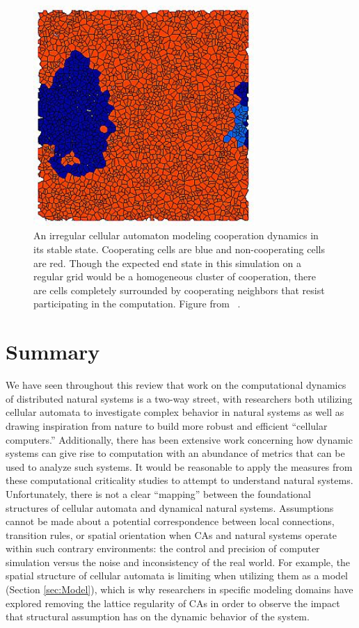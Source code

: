 \documentclass[a4paper,11pt,twoside]{report}
\begin{document}
\begin{figure}[htp]
\centering
\includegraphics[width=0.75\textwidth]{fl01_fig9_color.jpg}
\caption[``Dead Cells'' in Voronoi CA]{
An irregular cellular automaton modeling cooperation dynamics in its stable state. Cooperating cells are blue and non-cooperating cells are red. Though the expected end state in this simulation on a regular grid would be a homogeneous cluster of cooperation, there are cells completely surrounded by cooperating neighbors that resist participating in the computation. Figure from \citeauthor{fl01}~\cite{fl01}.
}
\label{fig:dead_cells}
\end{figure}

\section{Summary}
\label{sec:PrevSum} 

We have seen throughout this review that work on the computational dynamics of distributed natural systems is a two-way street, 
with researchers both utilizing cellular automata to investigate complex behavior in natural systems as well as drawing inspiration from nature to build more robust and efficient ``cellular computers.'' Additionally, there has been extensive work concerning how dynamic systems can give rise to computation with an abundance of metrics that can be used to analyze such systems. It would be reasonable to apply the measures from these computational criticality studies to attempt to understand natural systems. Unfortunately, there is not a clear ``mapping'' between the foundational structures of cellular automata and dynamical natural systems. Assumptions cannot be made about a potential correspondence between local connections, transition rules, or spatial orientation when CAs and natural systems operate within such contrary environments: the control and precision of computer simulation versus the noise and inconsistency of the real world. For example, the spatial structure of cellular automata is limiting when utilizing them as a model (Section \ref{sec:Model}), which is why researchers in specific modeling domains have explored removing the lattice regularity of CAs in order to observe the impact that structural assumption has on the dynamic behavior of the system.
\end{document}
